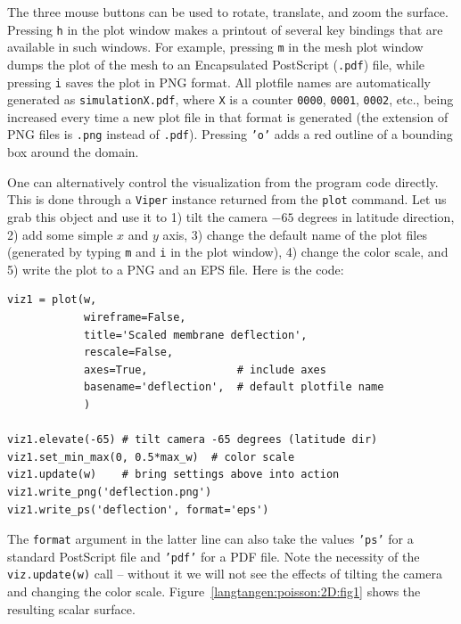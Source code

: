 The three mouse buttons can be used to rotate, translate, and zoom
the surface.
Pressing {\fontsize{12pt}{12pt}\texttt{h}} in the plot window makes a printout of several
key bindings that are available in such windows. For example,
pressing {\fontsize{12pt}{12pt}\texttt{m}} in the mesh plot window
dumps the plot of the mesh to an Encapsulated PostScript ({\fontsize{12pt}{12pt}\texttt{.pdf}})
file, while pressing {\fontsize{12pt}{12pt}\texttt{i}} saves the plot in PNG format.
All plotfile names are automatically generated as {\fontsize{12pt}{12pt}\texttt{simulationX.pdf}},
where {\fontsize{12pt}{12pt}\texttt{X}} is a counter {\fontsize{12pt}{12pt}\texttt{0000}}, {\fontsize{12pt}{12pt}\texttt{0001}}, {\fontsize{12pt}{12pt}\texttt{0002}}, etc.,
being increased every time a new plot file in that format
is generated (the extension
of PNG files is {\fontsize{12pt}{12pt}\texttt{.png}} instead of {\fontsize{12pt}{12pt}\texttt{.pdf}}).
Pressing {\fontsize{12pt}{12pt}\texttt{'o'}} adds a red outline of a bounding box around the domain.

One can alternatively control the visualization from the program code
directly. This is done through a {\fontsize{12pt}{12pt}\texttt{Viper}} instance returned from
the {\fontsize{12pt}{12pt}\texttt{plot}} command. Let us grab this object and use it to
1) tilt the camera $-65$ degrees in latitude direction, 2) add some simple
$x$ and $y$ axis, 3) change the default name of the plot files (generated
by typing {\fontsize{12pt}{12pt}\texttt{m}} and {\fontsize{12pt}{12pt}\texttt{i}} in the plot window),
4) change the color scale, and 5) write the plot
to a PNG and an EPS file. Here is the code:
\begin{Verbatim}[fontsize=\fontsize{10pt}{10pt},tabsize=8,baselinestretch=1.05,
fontfamily=tt,xleftmargin=7mm]
viz1 = plot(w,
            wireframe=False,
            title='Scaled membrane deflection',
            rescale=False,
            axes=True,              # include axes
            basename='deflection',  # default plotfile name
            )

viz1.elevate(-65) # tilt camera -65 degrees (latitude dir)
viz1.set_min_max(0, 0.5*max_w)  # color scale
viz1.update(w)    # bring settings above into action
viz1.write_png('deflection.png')
viz1.write_ps('deflection', format='eps')
\end{Verbatim}
\noindent
The {\fontsize{12pt}{12pt}\texttt{format}} argument in the latter line can also take the values
{\fontsize{12pt}{12pt}\texttt{'ps'}} for a standard PostScript file and {\fontsize{12pt}{12pt}\texttt{'pdf'}} for
a PDF file.
Note the necessity of the {\fontsize{12pt}{12pt}\texttt{viz.update(w)}} call -- without it we will
not see the effects of tilting the camera and changing the color scale.
Figure~\ref{langtangen:poisson:2D:fig1} shows the resulting scalar surface.

